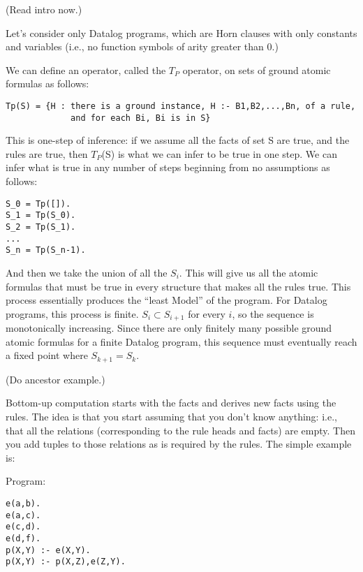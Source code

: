 (Read intro now.)

Let's consider only Datalog programs, which are Horn clauses with only
constants and variables (i.e., no function symbols of arity greater
than 0.)

We can define an operator, called the $T_P$ operator, on sets of ground
atomic formulas as follows:

\begin{verbatim}
Tp(S) = {H : there is a ground instance, H :- B1,B2,...,Bn, of a rule,
             and for each Bi, Bi is in S}
\end{verbatim}

This is one-step of inference: if we assume all the facts of set S are
true, and the rules are true, then $T_P$(S) is what we can infer to be
true in one step.  We can infer what is true in any number of steps
beginning from no assumptions as follows:

\begin{verbatim}
S_0 = Tp([]).
S_1 = Tp(S_0).
S_2 = Tp(S_1).
...
S_n = Tp(S_n-1).
\end{verbatim}

And then we take the union of all the $S_i$.  This will give us all the
atomic formulas that must be true in every structure that makes all
the rules true.  This process essentially produces the ``least Model''
of the program.  For Datalog programs, this process is finite.
$S_i \subset S_{i+1}$ for every $i$, so the sequence is monotonically
increasing.  Since there are only finitely many possible ground atomic
formulas for a finite Datalog program, this sequence must eventually
reach a fixed point where $S_{k+1} = S_k$.

(Do ancestor example.)

Bottom-up computation starts with the facts and derives new facts
using the rules.  The idea is that you start assuming that you don't
know anything: i.e., that all the relations (corresponding to the rule
heads and facts) are empty.  Then you add tuples to those relations as
is required by the rules.  The simple example is:

Program:
\begin{verbatim}
e(a,b).
e(a,c).
e(c,d).
e(d,f).
p(X,Y) :- e(X,Y).
p(X,Y) :- p(X,Z),e(Z,Y).
\end{verbatim}

